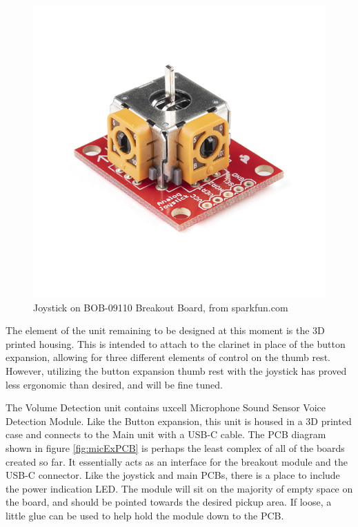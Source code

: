 \begin{figure}
    \centering
    \includegraphics{diagrams/oem/16273-Thumb_Joystick_-_Deluxe-03.jpg}
    \caption{Joystick on BOB-09110 Breakout Board, from sparkfun.com}
    \label{fig:js2}
\end{figure}

The element of the unit remaining to be designed at this moment is the 3D printed housing. This is intended to attach to the clarinet in place of the button expansion, allowing for three different elements of control on the thumb rest. However, utilizing the button expansion thumb rest with the joystick has proved less ergonomic than desired, and will be fine tuned.

The Volume Detection unit contains uxcell Microphone Sound Sensor Voice Detection Module. Like the Button expansion, this unit is housed in a 3D printed case and connects to the Main unit with a USB-C cable. The PCB diagram shown in figure \ref{fig:micExPCB} is perhaps the least complex of all of the boards created so far. It essentially acts as an interface for the breakout module and the USB-C connector. Like the joystick and main PCBs, there is a place to include the power indication LED. The module will sit on the majority of empty space on the board, and should be pointed towards the desired pickup area. If loose, a little glue can be used to help hold the module down to the PCB. 

